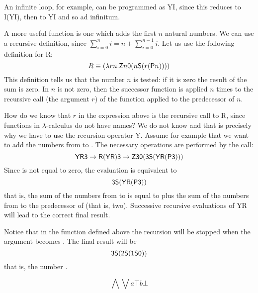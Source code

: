 An infinite loop, for example, can be programmed as {\sf YI}, since this reduces to {\sf I}({\sf YI}), then to {\sf YI} and so ad infinitum.

A more useful function is one which adds the first $n$ natural numbers. We can use a recursive definition, since $\sum^{n}_{i=0}i=n + \sum^{n-1}_{i=0}i$. Let us use the following definition for {\sf R}:
$$R\equiv (\lambda rn.{\sf Z} n{\sf 0}(n{\sf S}(r({\sf P}n))))$$ This definition tells us that the number $n$ is tested: if it is zero the result of the sum is zero. In $n$ is not zero, then the successor function is applied $n$ times to the recursive call (the argument $r$) of the function applied to the predecessor of $n$.

How do we know that $r$ in the expression above is the recursive call to {\sf R}, since functions in $\lambda$-calculus do not have names? We do not know and that is precisely why we have to use the recursion operator {\sf Y}. Assume for example that we want to add the numbers  from {} to {}. The necessary operations are performed by the call:
$${\sf YR3} \rightarrow  {\sf R}({\sf YR}){\sf 3} \rightarrow {\sf Z30}({\sf 3S}({\sf YR}({\sf P3})))$$ 
Since {} is not equal to zero, the evaluation is equivalent to $${\sf 3S}({\sf YR({\sf P3})})$$ that is, the sum of the numbers from {} to {} is equal to {} plus the sum of the numbers from {} to the predecessor of {} (that is, two). Successive recursive evaluations of {\sf YR} will lead to the correct final result. 

Notice that in the function defined above the recursion will be stopped when the argument becomes {}. The final result will be
$$
{\sf 3S}({\sf 2S}({\sf 1S0}))
$$
that is, the number {}.


\newcommand\lAnd{\ensuremath{\bigwedge}}
\newcommand\lOr{\ensuremath{\bigvee}}
\newcommand{\True}{\ensuremath{\top}}
\newcommand{\False}{\ensuremath{\bot}}

\[ \lAnd \lOr a\True b\False \]
